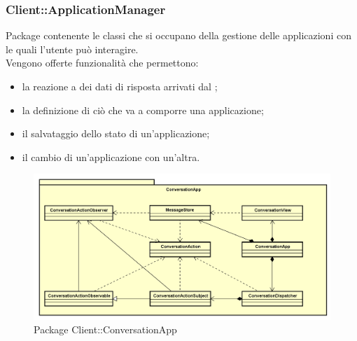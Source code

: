 \subsubsection{Client::ApplicationManager}
Package contenente le classi che si occupano della gestione delle applicazioni con le quali l'utente può interagire.\\
Vengono offerte funzionalità che permettono:
\begin{itemize}
\item la reazione a dei dati di risposta arrivati dal ;
\item la definizione di ciò che va a comporre una applicazione;
\item il salvataggio dello stato di un'applicazione;
\item il cambio di un'applicazione con un'altra.
\end{itemize}
\begin{figure}[h] \centering \includegraphics[width=\textwidth,height=\textheight,keepaspectratio]{images/diagrams/client/Client/ConversationApp.png}
	\caption{Package Client::ConversationApp}
\end{figure}
